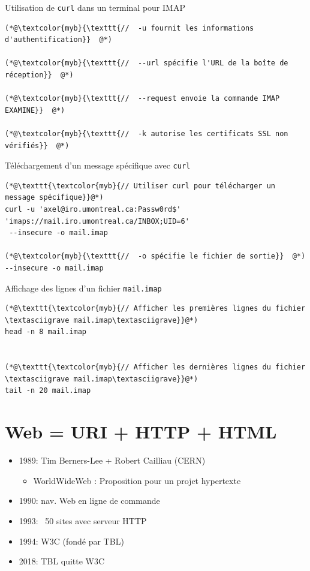 \documentclass{report}
\begin{document}
\begin{multicols*}{3}
\begin{EExample}{Utilisation de \texttt{curl} dans un terminal pour IMAP}{}
\begin{lstlisting}
(*@\textcolor{myb}{\texttt{//  -u fournit les informations d'authentification}}  @*)

(*@\textcolor{myb}{\texttt{//  --url spécifie l'URL de la boîte de réception}}  @*)

(*@\textcolor{myb}{\texttt{//  --request envoie la commande IMAP EXAMINE}}  @*)

(*@\textcolor{myb}{\texttt{//  -k autorise les certificats SSL non vérifiés}}  @*)
    \end{lstlisting}
\end{EExample}



\begin{EExample}{Téléchargement d'un message spécifique avec \texttt{curl}}{}
    \begin{lstlisting}
(*@\texttt{\textcolor{myb}{// Utiliser curl pour télécharger un message spécifique}}@*)
curl -u 'axel@iro.umontreal.ca:Passw0rd$' 'imaps://mail.iro.umontreal.ca/INBOX;UID=6'
 --insecure -o mail.imap

(*@\textcolor{myb}{\texttt{//  -o spécifie le fichier de sortie}}  @*)
--insecure -o mail.imap
    \end{lstlisting}

\end{EExample}

\begin{EExample}{Affichage des lignes d'un fichier \texttt{mail.imap}}{}

\begin{lstlisting}
(*@\texttt{\textcolor{myb}{// Afficher les premières lignes du fichier \textasciigrave mail.imap\textasciigrave}}@*)
head -n 8 mail.imap


(*@\texttt{\textcolor{myb}{// Afficher les dernières lignes du fichier \textasciigrave mail.imap\textasciigrave}}@*)
tail -n 20 mail.imap
\end{lstlisting}
\end{EExample}


\section{Web = URI + HTTP + HTML}

\begin{itemize}
    \item 1989: Tim Berners-Lee + Robert Cailliau (CERN) 
    \begin{itemize}
        \item WorldWideWeb : Proposition pour un projet hypertexte
    \end{itemize}
    \item 1990: nav. Web en ligne de commande
    \item 1993: ~50 sites avec serveur HTTP
    \item 1994: W3C (fondé par TBL)
    \item 2018: TBL quitte W3C
\end{itemize}



\end{multicols*}
\end{document}
